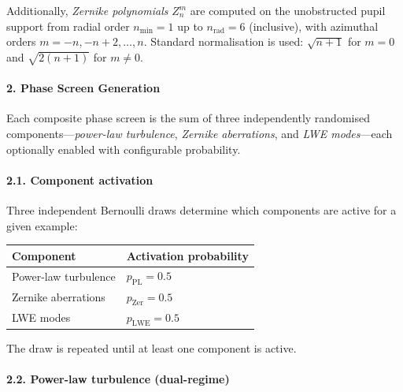 \documentclass{aa}
\begin{document}
Additionally, \emph{Zernike polynomials} $Z_n^m$ are computed on the unobstructed pupil support from radial order $n_\mathrm{min} = 1$ up to $n_\mathrm{rad} = 6$ (inclusive), with azimuthal orders $m = -n, -n+2, \ldots, n$. Standard normalisation is used: $\sqrt{n+1}$ for $m=0$ and $\sqrt{2(n+1)}$ for $m \neq 0$.

\paragraph{2. Phase Screen Generation}

Each composite phase screen is the sum of three independently randomised components---\emph{power-law turbulence}, \emph{Zernike aberrations}, and \emph{LWE modes}---each optionally enabled with configurable probability.

\paragraph{2.1. Component activation}

Three independent Bernoulli draws determine which components are active for a given example:
\begin{table}[h]
\centering
\begin{tabular}{|l|l|}
\hline
\textbf{Component} & \textbf{Activation probability} \\
\hline
Power-law turbulence & $p_\mathrm{PL} = 0.5$ \\
Zernike aberrations & $p_\mathrm{Zer} = 0.5$ \\
LWE modes & $p_\mathrm{LWE} = 0.5$ \\
\hline
\end{tabular}
\end{table}

The draw is repeated until at least one component is active.

\paragraph{2.2. Power-law turbulence (dual-regime)}
\end{document}
